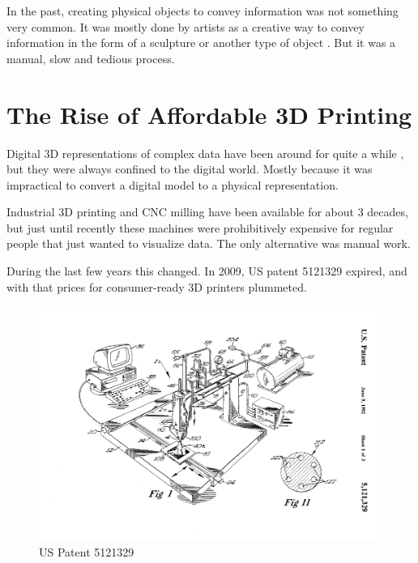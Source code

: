 In the past, creating physical objects to convey information was not something
very common. It was mostly done by artists as a creative way to convey
information in the form of a sculpture or another type of object
\cite{day:2009}\cite{schenker:2012}. But it was a manual, slow and tedious
process.


\section{The Rise of Affordable 3D Printing}\label{sec:history-3dprinting}

Digital 3D representations of complex data have been around for quite a while
\cite{marcus:2003}, but they were always confined to the digital world.  Mostly
because it was impractical to convert a digital model to a physical
representation.

Industrial 3D printing and CNC milling have been available for about 3 decades,
but just until recently these machines were prohibitively expensive for regular
people that just wanted to visualize data. The only alternative was manual work.


During the last few years this changed. In 2009, US patent 5121329
\cite{us5121329:1992} expired, and with that prices for consumer-ready 3D
printers plummeted.

\begin{figure}[h]
	\centering
	\includegraphics[width=\textwidth]{images/US5121329-1.png}
	\caption{US Patent 5121329}
	\label{img:us5121329a}
\end{figure}


